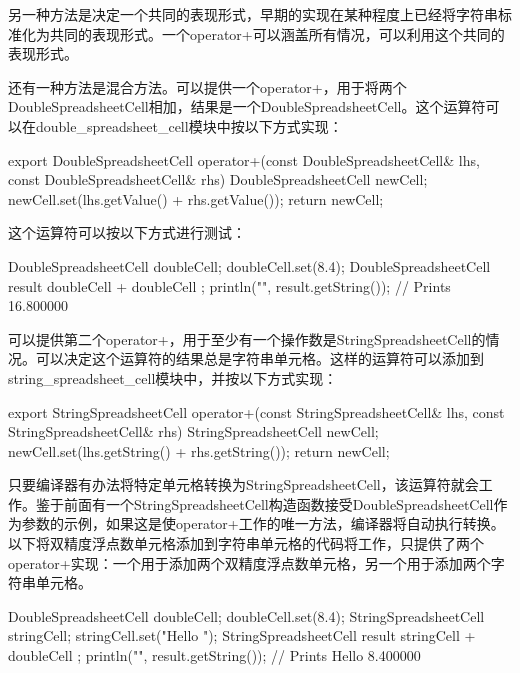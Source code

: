 另一种方法是决定一个共同的表现形式，早期的实现在某种程度上已经将字符串标准化为共同的表现形式。一个operator+可以涵盖所有情况，可以利用这个共同的表现形式。

还有一种方法是混合方法。可以提供一个operator+，用于将两个DoubleSpreadsheetCell相加，结果是一个DoubleSpreadsheetCell。这个运算符可以在double\_spreadsheet\_cell模块中按以下方式实现：

\begin{cpp}
export DoubleSpreadsheetCell operator+(const DoubleSpreadsheetCell& lhs,
                                       const DoubleSpreadsheetCell& rhs)
{
    DoubleSpreadsheetCell newCell;
    newCell.set(lhs.getValue() + rhs.getValue());
    return newCell;
}
\end{cpp}

这个运算符可以按以下方式进行测试：

\begin{cpp}
DoubleSpreadsheetCell doubleCell; doubleCell.set(8.4);
DoubleSpreadsheetCell result { doubleCell + doubleCell };
println("{}", result.getString()); // Prints 16.800000
\end{cpp}

可以提供第二个operator+，用于至少有一个操作数是StringSpreadsheetCell的情况。可以决定这个运算符的结果总是字符串单元格。这样的运算符可以添加到string\_spreadsheet\_cell模块中，并按以下方式实现：

\begin{cpp}
export StringSpreadsheetCell operator+(const StringSpreadsheetCell& lhs,
                                       const StringSpreadsheetCell& rhs)
{
    StringSpreadsheetCell newCell;
    newCell.set(lhs.getString() + rhs.getString());
    return newCell;
}
\end{cpp}

只要编译器有办法将特定单元格转换为StringSpreadsheetCell，该运算符就会工作。鉴于前面有一个StringSpreadsheetCell构造函数接受DoubleSpreadsheetCell作为参数的示例，如果这是使operator+工作的唯一方法，编译器将自动执行转换。以下将双精度浮点数单元格添加到字符串单元格的代码将工作，只提供了两个operator+实现：一个用于添加两个双精度浮点数单元格，另一个用于添加两个字符串单元格。

\begin{cpp}
DoubleSpreadsheetCell doubleCell; doubleCell.set(8.4);
StringSpreadsheetCell stringCell; stringCell.set("Hello ");
StringSpreadsheetCell result { stringCell + doubleCell };
println("{}", result.getString()); // Prints Hello 8.400000
\end{cpp}

